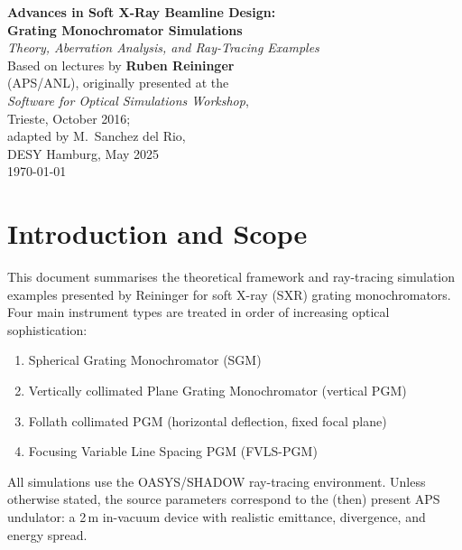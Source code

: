 \documentclass[12pt,a4paper]{article}
\begin{document}

\begin{titlepage}
  \centering
  \vspace*{2cm}
  {\huge\bfseries Advances in Soft X-Ray Beamline Design:\\[0.4em]
   Grating Monochromator Simulations}\\[1.5em]
  {\large\itshape Theory, Aberration Analysis, and Ray-Tracing Examples}\\[2em]
  {\normalsize Based on lectures by \textbf{Ruben Reininger}\\
   (APS/ANL), originally presented at the\\
   \textit{Software for Optical Simulations Workshop},\\
   Trieste, October 2016;\\
   adapted by M.\ Sanchez del Rio,\\
   DESY Hamburg, May 2025}\\[4em]
  {\normalsize\today}
  \vfill
\end{titlepage}

\tableofcontents
\newpage

\section{Introduction and Scope}

This document summarises the theoretical framework and ray-tracing simulation examples
presented by Reininger for soft X-ray (SXR) grating monochromators.  Four main instrument
types are treated in order of increasing optical sophistication:

\begin{enumerate}
  \item Spherical Grating Monochromator (SGM)
  \item Vertically collimated Plane Grating Monochromator (vertical PGM)
  \item Follath collimated PGM (horizontal deflection, fixed focal plane)
  \item Focusing Variable Line Spacing PGM (FVLS-PGM)
\end{enumerate}

All simulations use the OASYS/SHADOW ray-tracing environment.  Unless otherwise stated,
the source parameters correspond to the (then) present APS undulator: a 2\,m in-vacuum
device with realistic emittance, divergence, and energy spread.
\end{document}

